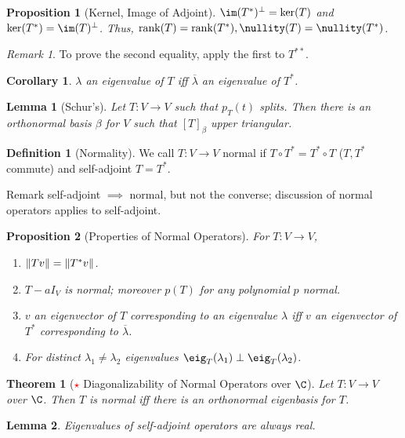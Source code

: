 \documentclass[12pt, oneside]{article}
\theoremstyle{definition}
\newtheorem{defn}{Definition}
\theoremstyle{plain}
\newtheorem{thm}{Theorem}
\newtheorem{cor}{Corollary}
\newtheorem{prop}{Proposition}
\newtheorem{lemma}{Lemma}
\theoremstyle{remark}
\newtheorem{remark}{Remark}
\begin{document}
\begin{prop}[Kernel, Image of Adjoint]
  $\im(T^\ast)^\perp = \ker(T)$ and $\ker(T^\ast) = \im(T)^\perp$. Thus, $\rank(T) = \rank(T^\ast), \nullity(T) =\nullity(T^\ast)$.
\end{prop}

\begin{remark}
  To prove the second equality, apply the first to $T^{\ast\ast}$.
\end{remark}
\begin{cor}
  $\lambda$ an eigenvalue of $T$ iff $\overline{\lambda}$ an eigenvalue of $T^\ast$.
\end{cor}
\begin{lemma}[Schur's]
  Let $T : V \to V$ such that $p_T(t)$ splits. Then there is an orthonormal basis $\beta$ for $V$ such that $[T]_\beta$ upper triangular.
\end{lemma}

\begin{defn}[Normality]
  We call $T : V \to V$ normal if $T \circ T^\ast = T^\ast \circ T$ ($T,T^\ast$ commute) and self-adjoint $T = T^\ast$.

  Remark self-adjoint $\implies$ normal, but not the converse; discussion of normal operators applies to self-adjoint.
\end{defn}

\begin{prop}[Properties of Normal Operators]
For $T : V\to V$, \begin{enumerate}[label=(\alph*)]
  \item $\norm{Tv} = \norm{T^\ast v}$.
  \item $T - aI_V$ is normal; moreover $p(T)$ for any polynomial $p$ normal.
  \item $v$ an eigenvector of $T$ corresponding to an eigenvalue $\lambda$ iff $v$ an eigenvector of $T^\ast$ corresponding to $\overline{\lambda}$.
  \item For distinct $\lambda_1 \neq \lambda_2$ eigenvalues $\eig_T(\lambda_1) \perp \eig_T(\lambda_2)$.
\end{enumerate}
\end{prop}

\begin{thm}[\textcolor{red}{$\star$} Diagonalizability of Normal Operators over $\C$]
  Let $T : V \to V$ over $\C$. Then $T$ is normal iff there is an orthonormal eigenbasis for $T$.
\end{thm}

\begin{lemma}
  Eigenvalues of self-adjoint operators are always real.
\end{lemma}
\end{document}
